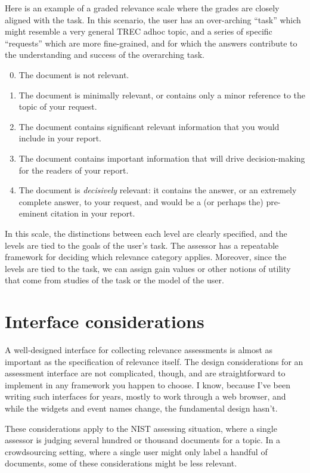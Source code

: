 \documentclass[nobib]{tufte-book}
\begin{document}
Here is an example of a graded relevance scale where the grades are closely aligned with the task.  In this scenario, the user has an over-arching ``task'' which might resemble a very general TREC adhoc topic, and a series of specific ``requests'' which are more fine-grained, and for which the answers contribute to the understanding and success of the overarching task.

\begin{enumerate}
\setcounter{enumi}{-1}   
    \item The document is not relevant.
    \item The document is minimally relevant, or contains only a minor reference to the topic of your request.
    \item The document contains significant relevant information that you would include in your report.
    \item The document contains important information that will drive decision-making for the readers of your report.
    \item The document is {\em decisively} relevant: it contains the answer, or an extremely complete answer, to your request, and would be a (or perhaps the) pre-eminent citation in your report.
\end{enumerate}

In this scale, the distinctions between each level are clearly specified, and the levels are tied to the goals of the user's task.  The assessor has a repeatable framework for deciding which relevance category applies.  Moreover, since the levels are tied to the task, we can assign gain values or other notions of utility that come from studies of the task or the model of the user.

\section{Interface considerations}
\label{sec:interface-considerations}

A well-designed interface for collecting relevance assessments is almost as important as the specification of relevance itself.  The design considerations for an assessment interface are not complicated, though, and are straightforward to implement in any framework you happen to choose.  I know, because I've been writing such interfaces for years, mostly to work through a web browser, and while the widgets and event names change, the fundamental design hasn't.

These considerations apply to the NIST assessing situation, where a single assessor is judging several hundred or thousand documents for a topic.  In a crowdsourcing setting, where a single user might only label a handful of documents, some of these considerations might be less relevant.
\end{document}
